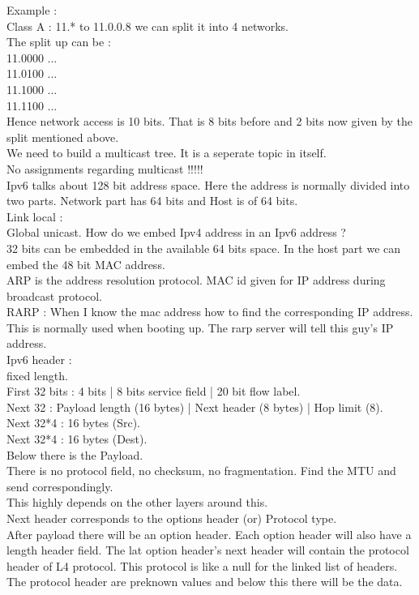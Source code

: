 \documentclass[solution,addpoints,12pt]{exam}
\begin{document}
Example :\\
Class A : 11.* to 11.0.0.8 we can split it into 4 networks.\\
The split up can be :\\
11.0000 ...\\
11.0100 ...\\
11.1000 ...\\
11.1100 ...\\
Hence network access is 10 bits. That is 8 bits before
and 2 bits now given by the split mentioned above.\\
We need to build a multicast tree. It is a seperate topic in itself.\\
No assignments regarding multicast !!!!!\\
Ipv6 talks about 128 bit address space. Here the address is normally
divided into two parts. Network part has 64 bits and Host is of 64 bits.\\
Link local :\\
Global unicast. How do we embed Ipv4 address in an Ipv6 address ?\\
32 bits can be embedded in the available 64 bits space. In the host
part we can embed the 48 bit MAC address.\\
ARP is the address resolution protocol. MAC id given for IP address
during broadcast protocol.\\
RARP : When I know the mac address how to find the corresponding IP address.
This is normally used when booting up. The rarp server will tell this guy's
IP address.\\
Ipv6 header :\\
fixed length.\\
First 32 bits : 4 bits | 8 bits service field | 20 bit flow label.\\
Next 32 :  Payload length (16 bytes) | Next header (8 bytes) | Hop limit (8).\\
Next 32*4 : 16 bytes (Src).\\
Next 32*4 : 16 bytes (Dest).\\
Below there is the Payload.\\
There is no protocol field, no checksum, no fragmentation. Find the MTU
and send correspondingly.\\
This highly depends on the other layers around this.\\
Next header corresponds to the options header (or) Protocol type.\\
After payload there will be an option header. Each option header will
also have a length header field. The lat option header's next header will
contain the protocol header of L4 protocol. This protocol is like
a null for the linked list of headers. The protocol header are preknown
values and below this there will be the data.\\
\end{document}
